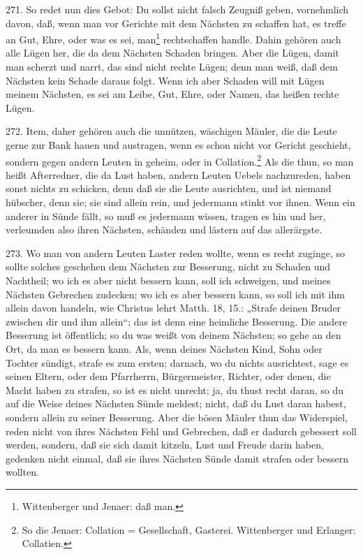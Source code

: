 271. So redet nun dies Gebot: Du sollst nicht falsch Zeugniß geben, vornehmlich davon, daß, wenn man vor Gerichte mit dem Nächsten zu schaffen hat, es treffe an Gut, Ehre, oder was es sei, man\footnote{Wittenberger und Jenaer: daß man.} rechtschaffen handle. Dahin gehören auch alle Lügen her, die da dem Nächsten Schaden bringen. Aber die Lügen, damit man scherzt und narrt, das sind nicht rechte Lügen; denn man weiß, daß dem Nächsten kein Schade daraus folgt. Wenn ich aber Schaden will mit Lügen meinem Nächsten, es sei am Leibe, Gut, Ehre, oder Namen, das heißen rechte Lügen.

272. Item, daher gehören auch die unnützen, wäschigen Mäuler, die die Leute gerne zur Bank hauen und austragen, wenn es schon nicht vor Gericht geschieht, sondern gegen andern Leuten in geheim, oder in Collation.\footnote{So die Jenaer: Collation = Gesellschaft, Gasterei. Wittenberger und Erlanger: Collatien.} Als die thun, so man heißt Afterredner, die da Lust haben, andern Leuten Uebels nachzureden, haben sonst nichts zu schicken, denn daß sie die Leute ausrichten, und ist niemand hübscher, denn sie; sie sind allein rein, und jedermann stinkt vor ihnen. Wenn ein anderer in Sünde fällt, so muß es jedermann wissen, tragen es hin und her, verleumden also ihren Nächsten, schänden und lästern auf das allerärgste.

273. Wo man von andern Leuten Laster reden wollte, wenn es recht zuginge, so sollte solches geschehen dem Nächsten zur Besserung, nicht zu Schaden und Nachtheil; wo ich es aber nicht bessern kann, soll ich schweigen, und meines Nächsten Gebrechen zudecken; wo ich es aber bessern kann, so soll ich mit ihm allein davon handeln, wie Christus lehrt Matth. 18, 15.: „Strafe deinen Bruder zwischen dir und ihm allein“; das ist denn eine heimliche Besserung. Die andere Besserung ist öffentlich; so du was weißt von deinem Nächsten; so gehe an den Ort, da man es bessern kann. Als, wenn deines Nächsten Kind, Sohn oder Tochter sündigt, strafe es zum ersten; darnach, wo du nichts ausrichtest, sage es seinen Eltern, oder dem Pfarrherrn, Bürgermeister, Richter, oder denen, die
Macht haben zu strafen, so ist es nicht unrecht; ja, du thust recht daran, so du auf die Weise deines Nächsten Sünde meldest; nicht, daß du Lust daran habest, sondern allein zu seiner Besserung. Aber die bösen Mäuler thun das Widerspiel, reden nicht von ihres Nächsten Fehl und Gebrechen, daß er dadurch gebessert soll werden, sondern, daß sie sich damit kitzeln, Lust und Freude darin haben, gedenken nicht einmal, daß sie ihres Nächsten Sünde damit strafen oder bessern wollten.

